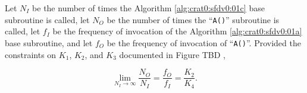 \begin{vworklemmastatement}
\label{lem:crat0:sfdv0:sprx0:02}
Let $N_I$ be the number of times the Algorithm \ref{alg:crat0:sfdv0:01c} 
base subroutine
is called, let $N_O$ be the number of times the 
``\texttt{A()}'' subroutine is called, let
$f_I$ be the frequency of invocation of the 
Algorithm \ref{alg:crat0:sfdv0:01a} 
base subroutine, and let 
$f_O$ be the frequency of invocation of 
``\texttt{A()}''.  Provided the constraints
on $K_1$, $K_2$, and $K_3$ documented in
Figure TBD
,

\begin{equation}
\label{eq:lem:crat0:sfdv0:sprx0:02:01}
\lim_{N_I\rightarrow\infty}\frac{N_O}{N_I}
=
\frac{f_O}{f_I}
=
\frac{K_2}{K_4} . 
\end{equation} 
\end{vworklemmastatement}
